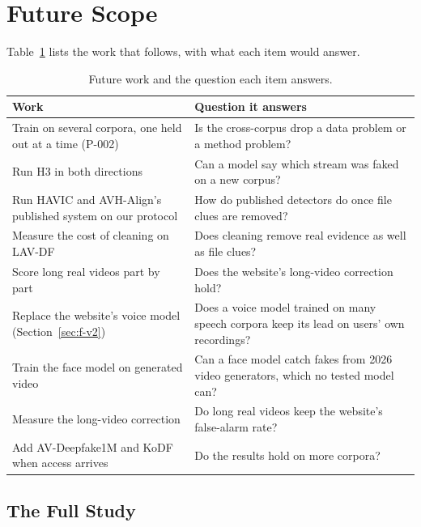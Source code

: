 \section{Future Scope}
\label{sec:next}

Table~\ref{tab:futurework} lists the work that follows, with what each item would answer.

\begin{table}[ht]
    \centering
    \small
    \caption{Future work and the question each item answers.}
    \label{tab:futurework}
    \begin{tabularx}{\textwidth}{@{}>{\raggedright\arraybackslash}p{5cm}>{\raggedright\arraybackslash}X@{}}
        \toprule
        \textbf{Work} & \textbf{Question it answers} \\
        \midrule
        Train on several corpora, one held out at a time (P-002) & Is the cross-corpus drop a data problem or a method problem? \\
        Run H3 in both directions & Can a model say which stream was faked on a new corpus? \\
        Run HAVIC and AVH-Align's published system on our protocol & How do published detectors do once file clues are removed? \\
        Measure the cost of cleaning on LAV-DF & Does cleaning remove real evidence as well as file clues? \\
        Score long real videos part by part & Does the website's long-video correction hold? \\
        Replace the website's voice model (Section~\ref{sec:f-v2}) & Does a voice model trained on many speech corpora keep its lead on users' own recordings? \\
        Train the face model on generated video & Can a face model catch fakes from 2026 video generators, which no tested model can? \\
        Measure the long-video correction & Do long real videos keep the website's false-alarm rate? \\
        Add AV-Deepfake1M and KoDF when access arrives & Do the results hold on more corpora? \\
        \bottomrule
    \end{tabularx}
\end{table}


\subsection{The Full Study}

